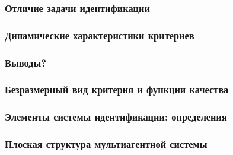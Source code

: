 \documentclass[10pt,utf8]{beamer}
\begin{document}

\begin{frame}
  \frametitle{Отличие задачи идентификации}


\end{frame}




\begin{frame}
  \frametitle{Динамические характеристики критериев}


\end{frame}




\begin{frame}
  \frametitle{Выводы?}


\end{frame}






\begin{frame}
  \frametitle{Безразмерный вид критерия и функции качества}


\end{frame}



\begin{frame}
  \frametitle{Элементы системы идентификации: определения}


\end{frame}




\begin{frame}
  \frametitle{Плоская структура мультиагентной системы}


\end{frame}



\end{document}
